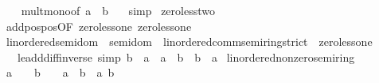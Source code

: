 \begin{isabellebody}
%
\isadelimproof
\ \ %
\endisadelimproof
%
\isatagproof
{}\isamarkupfalse%
\ mult{\isacharunderscore}{\kern0pt}mono{\isacharbrackleft}{\kern0pt}of\ a\ {}\ b\ {}{\isacharbrackright}{\kern0pt}\ \isamarkupfalse%
\ simp%
\endisatagproof
{\isafoldproof}%
%
\isadelimproof
\isanewline
%
\endisadelimproof
\isanewline
{}\isamarkupfalse%
\ zero{\isacharunderscore}{\kern0pt}less{\isacharunderscore}{\kern0pt}two{\isacharcolon}{\kern0pt}\ {\isachardoublequoteopen}{}\ {\isacharless}{\kern0pt}\ {}\ {\isacharplus}{\kern0pt}\ {}{\isachardoublequoteclose}\isanewline
%
\isadelimproof
\ \ %
\endisadelimproof
%
\isatagproof
{}\isamarkupfalse%
\ add{\isacharunderscore}{\kern0pt}pos{\isacharunderscore}{\kern0pt}pos{\isacharbrackleft}{\kern0pt}OF\ zero{\isacharunderscore}{\kern0pt}less{\isacharunderscore}{\kern0pt}one\ zero{\isacharunderscore}{\kern0pt}less{\isacharunderscore}{\kern0pt}one{\isacharbrackright}{\kern0pt}\ \isacommand{{\isachardot}{\kern0pt}}\isamarkupfalse%
%
\endisatagproof
{\isafoldproof}%
%
\isadelimproof
\isanewline
%
\endisadelimproof
\isanewline
{}\isamarkupfalse%
\isanewline
\isanewline
{}\isamarkupfalse%
\ linordered{\isacharunderscore}{\kern0pt}semidom\ {\isacharequal}{\kern0pt}\ semidom\ {\isacharplus}{\kern0pt}\ linordered{\isacharunderscore}{\kern0pt}comm{\isacharunderscore}{\kern0pt}semiring{\isacharunderscore}{\kern0pt}strict\ {\isacharplus}{\kern0pt}\ zero{\isacharunderscore}{\kern0pt}less{\isacharunderscore}{\kern0pt}one\ {\isacharplus}{\kern0pt}\isanewline
\ \ \ le{\isacharunderscore}{\kern0pt}add{\isacharunderscore}{\kern0pt}diff{\isacharunderscore}{\kern0pt}inverse{}\ {\isacharbrackleft}{\kern0pt}simp{\isacharbrackright}{\kern0pt}{\isacharcolon}{\kern0pt}\ {\isachardoublequoteopen}b\ {\isasymle}\ a\ {\isasymLongrightarrow}\ a\ {\isacharminus}{\kern0pt}\ b\ {\isacharplus}{\kern0pt}\ b\ {\isacharequal}{\kern0pt}\ a{\isachardoublequoteclose}\isanewline
{}\isanewline
\isanewline
{}\isamarkupfalse%
\ linordered{\isacharunderscore}{\kern0pt}nonzero{\isacharunderscore}{\kern0pt}semiring\ \isanewline
%
\isadelimproof
%
\endisadelimproof
%
\isatagproof
{}\isamarkupfalse%
\isanewline
\ \ \isamarkupfalse%
\ {\isachardoublequoteopen}a\ {\isacharplus}{\kern0pt}\ {}\ {\isacharless}{\kern0pt}\ b\ {\isacharplus}{\kern0pt}\ {}{\isachardoublequoteclose}\ \ {\isachardoublequoteopen}a\ {\isacharless}{\kern0pt}\ b{\isachardoublequoteclose}\ \ a\ b\isanewline

\end{isabellebody}
